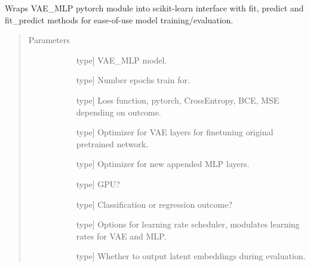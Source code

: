 \documentclass[letterpaper,10pt,english]{sphinxmanual}
\begin{document}
\begin{fulllineitems}
\label{\detokenize{index:methylnet.models.MLPFinetuneVAE}}
Wraps VAE\_MLP pytorch module into scikit-learn interface with fit, predict and fit\_predict methods for ease-of-use model training/evaluation.
\begin{quote}\begin{description}
\item[{Parameters}] \leavevmode\begin{description}
\item[{}] \leavevmode{[}type{]}
VAE\_MLP model.

\item[{}] \leavevmode{[}type{]}
Number epochs train for.

\item[{}] \leavevmode{[}type{]}
Loss function, pytorch, CrossEntropy, BCE, MSE depending on outcome.

\item[{}] \leavevmode{[}type{]}
Optimizer for VAE layers for finetuning original pretrained network.

\item[{}] \leavevmode{[}type{]}
Optimizer for new appended MLP layers.

\item[{}] \leavevmode{[}type{]}
GPU?

\item[{}] \leavevmode{[}type{]}
Classification or regression outcome?

\item[{}] \leavevmode{[}type{]}
Options for learning rate scheduler, modulates learning rates for VAE and MLP.

\item[{}] \leavevmode{[}type{]}
Whether to output latent embeddings during evaluation.


\end{description}
\end{description}
\end{quote}
\end{fulllineitems}
\end{document}
